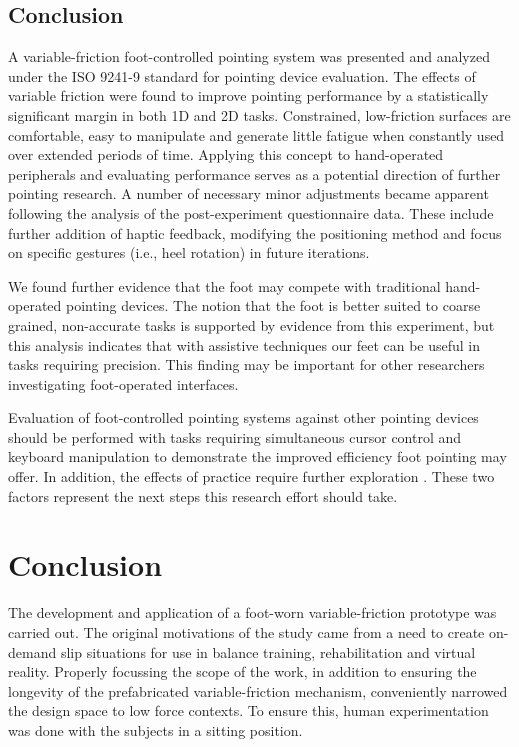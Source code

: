 \documentclass [12pt,letterpaper]{report}
\begin{document}
\section{Conclusion}

A variable-friction foot-controlled pointing system was presented and analyzed under the ISO 9241-9 standard for pointing device evaluation. The effects of variable friction were found to improve pointing performance by a statistically significant margin in both 1D and 2D tasks. Constrained, low-friction surfaces are comfortable, easy to manipulate and generate little fatigue when constantly used over extended periods of time. Applying this concept to hand-operated peripherals and evaluating performance serves as a potential direction of further pointing research. A number of necessary minor adjustments became apparent following the analysis of the post-experiment questionnaire data. These include further addition of haptic feedback, modifying the positioning method and focus on specific gestures (i.e., heel rotation) in future iterations.

We found further evidence that the foot may compete with traditional hand-operated pointing devices. The notion that the foot is better suited to coarse grained, non-accurate tasks is supported by evidence from this experiment, but this analysis indicates that with assistive techniques our feet can be useful in tasks requiring precision. This finding may be important for other researchers investigating foot-operated interfaces.

Evaluation of foot-controlled pointing systems against other pointing devices should be performed with tasks requiring simultaneous cursor control and keyboard manipulation to demonstrate the improved efficiency foot pointing may offer. In addition, the effects of practice require further exploration \cite{velloso2015feet}. These two factors represent the next steps this research effort should take.


\chapter{Conclusion}


The development and application of a foot-worn variable-friction prototype was carried out. The original motivations of the study came from a need to create on-demand slip situations for use in balance training, rehabilitation and virtual reality. Properly focussing the scope of the work, in addition to ensuring the longevity of the prefabricated variable-friction mechanism, conveniently narrowed the design space to low force contexts. To ensure this, human experimentation was done with the subjects in a sitting position.
\end{document}
